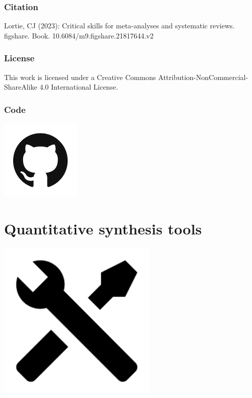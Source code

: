 \documentclass[
]{book}
\begin{document}
\hypertarget{citation}{%
\subsection*{Citation}\label{citation}}

Lortie, CJ (2023): Critical skills for meta-analyses and systematic reviews. figshare. Book. 10.6084/m9.figshare.21817644.v2

\hypertarget{license}{%
\subsection*{License}\label{license}}

This work is licensed under a Creative Commons Attribution-NonCommercial-ShareAlike 4.0 International License.

\hypertarget{code}{%
\subsection*{Code}\label{code}}

\href{https://github.com/zenrabbit/Quantitative_synthesis_tools}{\includegraphics{./GitHub.png}}

\hypertarget{tools}{%
\chapter{Quantitative synthesis tools}\label{tools}}

\includegraphics[width=3in,height=\textheight]{./tools.png}
\end{document}
